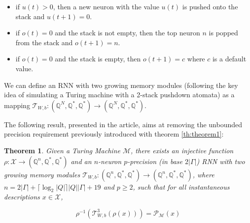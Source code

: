 \documentclass{article}
\newtheorem{theorem}{Theorem}
\begin{document}
\begin{itemize}
    \item if $u(t) > 0$, then a new neuron with the value $u(t)$ is pushed onto the stack and $u(t+1) = 0$.
    \item if $o(t) = 0$ and the stack is not empty, then the top neuron $n$ is popped from the stack and $o(t+1) = n$.
    \item if $o(t) = 0$ and the stack is empty, then $o(t+1) = c$ where $c$ is a default value.
\end{itemize}

We can define an RNN with two growing memory modules (following the key idea of simulating a Turing machine with a 2-stack pushdown atomata) as a mapping $\mathcal{T}_{W,b}:(\mathbb{Q}^N,\mathbb{Q}^*,\mathbb{Q}^*) \rightarrow (\mathbb{Q}^N,\mathbb{Q}^*,\mathbb{Q}^*)$.

The following result, presented in the article, aims at removing the unbounded precision requirement previously introduced with theorem \ref{th:theorem1}:

\begin{theorem}\label{th:theorem2}
    Given a Turing Machine $\mathcal{M}$, there exists an injective function $\rho:\mathcal{X} \rightarrow (\mathbb{Q}^n, \mathbb{Q}^*, \mathbb{Q}^*)$ and an $n$-neuron $p$-precision (in base $2|\Gamma|$) RNN with two growing memory modules $\mathcal{T}_{W,b}:(\mathbb{Q}^n, \mathbb{Q}^*, \mathbb{Q}^*) \rightarrow (\mathbb{Q}^n, \mathbb{Q}^*, \mathbb{Q}^*)$, where $n=2|\Gamma|+\lceil \log_2|Q|\rceil |Q||\Gamma| + 19$ and $p \geq 2$, such that for all instantaneous descriptions $x \in \mathcal{X}$,
    
    $$\rho^{-1}(\mathcal{T}^3_{W,b}(\rho(x))) = \mathcal{P}_{\mathcal{M}}(x)$$
\end{theorem}
\end{document}
